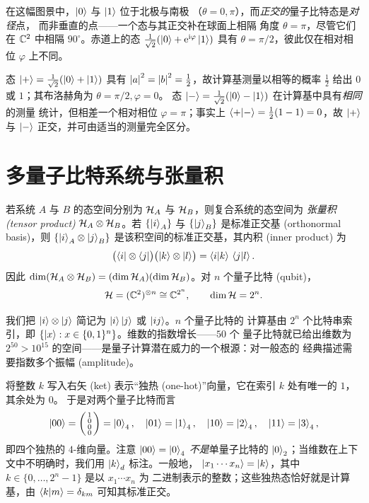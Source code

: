 \begin{remark}[读懂布洛赫球]
在这幅图景中，$\ket{0}$ 与 $\ket{1}$ 位于北极与南极
（$\theta=0,\pi$），而\emph{正交的}量子比特态是\emph{对径}点，
而非垂直的点——一个态与其正交补在球面上相隔
角度 $\theta=\pi$，尽管它们在 $\mathbb{C}^{2}$ 中相隔 $90^{\circ}$。赤道上的态 $\tfrac{1}{\sqrt2}(\ket{0}+\mathrm{e}^{\mathrm{i}\varphi}\ket{1})$
具有 $\theta=\pi/2$，彼此仅在相对相位 $\varphi$ 上不同。
\end{remark}

\begin{example}[振幅与归一化]\label{ex:lec01-pm}
态 $\ket{+}=\tfrac{1}{\sqrt2}(\ket{0}+\ket{1})$ 具有
$\left\lvert a \right\rvert^{2}=\left\lvert b \right\rvert^{2}=\tfrac12$，故计算基测量以相等的概率 $\tfrac12$ 给出 $0$
或 $1$；其布洛赫角为 $\theta=\pi/2,\varphi=0$。
态 $\ket{-}=\tfrac{1}{\sqrt2}(\ket{0}-\ket{1})$ 在计算基中具有\emph{相同}的测量
统计，但相差一个相对相位
$\varphi=\pi$；事实上 $\braket{+|-}=\tfrac12(1-1)=0$，故 $\ket{+}$ 与 $\ket{-}$
正交，并可由适当的测量完全区分。
\end{example}
\section{多量子比特系统与张量积}
\label{sec:lec01-2}

\begin{definition}[张量积态空间]\label{def:lec01-tensor}
若系统 $A$ 与 $B$ 的态空间分别为 $\mathcal{H}_A$ 与 $\mathcal{H}_B$，则复合系统的态空间为
\emph{张量积 (tensor product)} $\mathcal{H}_A\otimes\mathcal{H}_B$。若
$\{\ket{i}_A\}$ 与 $\{\ket{j}_B\}$ 是标准正交基 (orthonormal basis)，则
$\{\ket{i}_A\otimes\ket{j}_B\}$ 是该积空间的标准正交基，其内积 (inner product) 为
\[
  \bigl(\bra{i}\otimes\bra{j}\bigr)\bigl(\ket{k}\otimes\ket{l}\bigr)
    =\braket{i|k}\,\braket{j|l}.
\]
因此 $\dim(\mathcal{H}_A\otimes\mathcal{H}_B)=(\dim\mathcal{H}_A)(\dim\mathcal{H}_B)$。对 $n$ 个量子比特 (qubit)，
\[
  \mathcal{H}=(\mathbb{C}^{2})^{\otimes n}\cong\mathbb{C}^{2^{n}},\qquad \dim\mathcal{H}=2^{n}.
\]
\end{definition}

我们把 $\ket{i}\otimes\ket{j}$ 简记为 $\ket{i}\ket{j}$ 或 $\ket{ij}$。$n$ 个量子比特的
计算基由 $2^{n}$ 个比特串索引，即 $\{\ket{x}:x\in\{0,1\}^{n}\}$。维数的指数增长——$50$ 个
量子比特就已给出维数为 $2^{50}>10^{15}$ 的空间——是量子计算潜在威力的一个根源：对一般态的
经典描述需要指数多个振幅 (amplitude)。

\begin{remark}\label{rem:lec01-ket-k}
将整数 $k$ 写入右矢 (ket) 表示“独热 (one-hot)”向量，它在索引 $k$ 处有唯一的 $1$，其余处为 $0$。
于是对两个量子比特而言
\[
  \ket{00}=\begin{psmallmatrix}1\\0\\0\\0\end{psmallmatrix}=\ket{0}_4,\quad
  \ket{01}=\ket{1}_4,\quad \ket{10}=\ket{2}_4,\quad \ket{11}=\ket{3}_4,
\]
即四个独热的 $4$-维向量。注意 $\ket{00}=\ket{0}_4$ \emph{不是}单量子比特的
$\ket{0}_2$；当维数在上下文中不明确时，我们用 $\ket{k}_d$ 标注。一般地，
$\ket{x_1\cdots x_n}=\ket{k}$，其中 $k\in\{0,\dots,2^{n}-1\}$ 是以 $x_1\cdots x_n$ 为
二进制表示的整数；这些独热态恰好就是计算基，由 $\braket{k|m}=\delta_{km}$ 可知其标准正交。
\end{remark}

